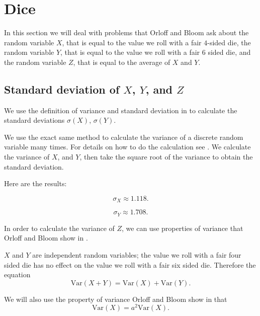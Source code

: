 \documentclass[a4paper,11pt]{article}
\begin{document}
\section{Dice}

In this section we will deal with problems that Orloff and
Bloom ask about the random variable $X$, that is equal to the value
we roll with a fair $4$-sided die, the random variable
$Y$, that is equal to the value we roll with a fair $6$ sided die,
and the random variable $Z$, that is equal to the average
of $X$ and $Y$.

\subsection{Standard deviation of $X$, $Y$, and $Z$}


We use the definition of variance and standard deviation in \cite{reading5a} to
calculate the standard deviations $\sigma \left( X \right)$, $\sigma \left( Y \right)$.

We use the exact same method to calculate the variance of a discrete random
variable many times. For details on how to do the calculation see
\cite{reading5aAns}.  We calculate the variance of $X$, and $Y$, then take
the square root of the variance to obtain the standard deviation.

Here are the results:

\begin{equation}
  \sigma_{X} \approx 1.118.
\end{equation}

\begin{equation}
	\sigma_{Y} \approx 1.708.
\end{equation}

In order to calculate the variance of $Z$, we can use properties of variance
that Orloff and Bloom show in \cite{reading5a}.

$X$ and $Y$ are independent random variables; the value we roll with a fair four
sided die has no effect on the value we roll with a fair six sided die.
Therefore the equation
\begin{equation}
	\text{Var}\left(X + Y \right)
	= \text{Var}\left(X \right) + \text{Var}\left( Y \right).
\end{equation}

We will also use the property of variance Orloff and Bloom show in
\cite{reading5a} that
\begin{equation}
	\text{Var}\left(X \right) = a^{2}\text{Var}\left(X \right).
\end{equation}
\end{document}

